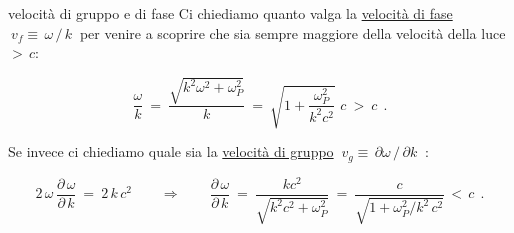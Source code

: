 %
%
\vspace{0.5cm}
\begin{approfondimento}{velocità di gruppo e di fase}
	Ci chiediamo quanto valga la \underline{velocità di fase} $\boxed{\ v_f \equiv\, \omega\,/\,k\ }$ per venire a scoprire che sia sempre maggiore della velocità della luce $>\, c$:
	
	\[ \frac{\omega}{k}\ =\ \frac{\sqrt{k^2\omega^2 + \omega^2_P}}{k}\ =\ \sqrt{1+\frac{\omega_P^2}{k^2 c^2}} \, \, c\ >\ c\ \ .\]
	
	Se invece ci chiediamo quale sia la \underline{velocità di gruppo} $\boxed{\ v_g \equiv\, \partial\omega\,/\,\partial k\ }$ :
	
	\[ 2\, \omega\, \frac{\partial\,\omega}{\partial\, k}\ =\ 2\, k\, c^2
	\quad \quad \Rightarrow \quad \quad 
	\frac{\partial\,\omega}{\partial\, k}\ =\ \frac{kc^2}{\sqrt{k^2c^2 + \omega_P^2 }}\ =\  \frac{c}{\sqrt{1 + \omega_P^2/k^2\,c^2 }}\, <\, c\ \ .\]
	
\end{approfondimento}


